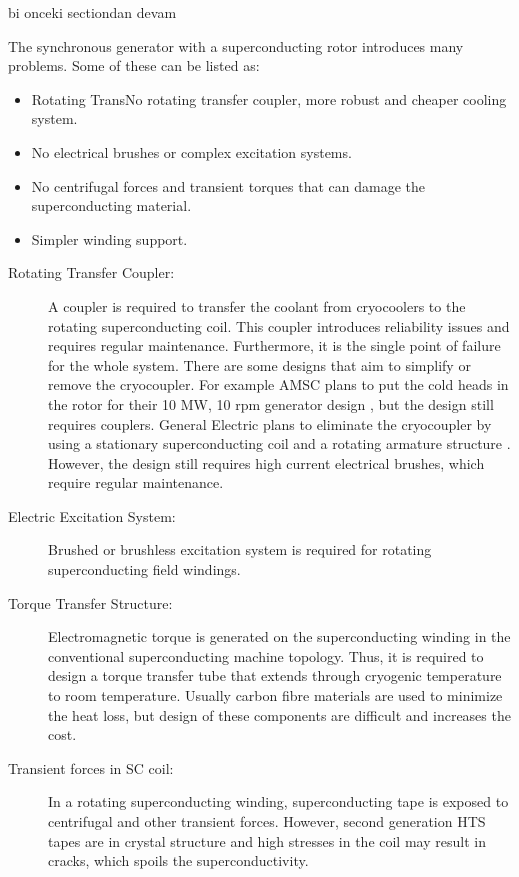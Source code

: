 \documentclass[12pt]{IET02}
\begin{document}
bi onceki sectiondan devam

The synchronous generator with a superconducting rotor introduces many problems. Some of these can be listed as:

\begin{itemize}
  \item Rotating TransNo rotating transfer coupler, more robust and cheaper cooling system.
  \item No electrical brushes or complex excitation systems.
  \item No centrifugal forces and transient torques that can damage the superconducting material.
  \item Simpler winding support.
\end{itemize}

\begin{description}
  \item[Rotating Transfer Coupler:] A coupler is required to transfer the coolant from cryocoolers to the rotating superconducting coil. This coupler introduces reliability issues and requires regular maintenance. Furthermore, it is the single point of failure for the whole system. There are some designs that aim to simplify or remove the cryocoupler. For example AMSC plans to put the cold heads in the rotor for their 10 MW, 10 rpm generator design \cite{amsc_presentation}, but the design still requires couplers. General Electric plans to eliminate the cryocoupler by using a stationary superconducting coil and a rotating armature structure \cite{Stautner2012}. However, the design still requires high current electrical brushes, which require regular maintenance.

  \item[Electric Excitation System:] Brushed or brushless excitation system is required for rotating superconducting field windings.

  \item[Torque Transfer Structure:] Electromagnetic torque is generated on the superconducting winding in the conventional superconducting machine topology. Thus, it is required to design a torque transfer tube that extends through cryogenic temperature to room temperature. Usually carbon fibre materials are used to minimize the heat loss, but design of these components are difficult and increases the cost.

  \item[Transient forces in SC coil:] In a rotating superconducting winding, superconducting tape is exposed to centrifugal and other transient forces. However, second generation HTS tapes are in crystal structure and high stresses in the coil may result in cracks, which spoils the superconductivity.
\end{description}
\end{document}
